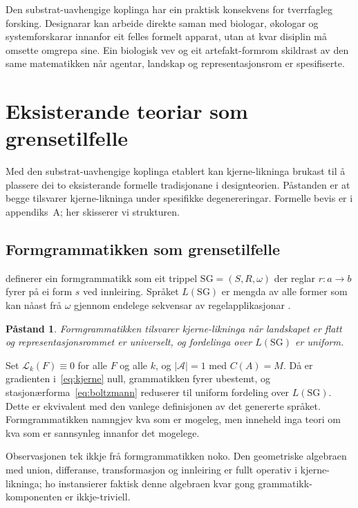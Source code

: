 \documentclass[10pt,a4paper,twocolumn]{article}
\newtheorem{proposition}{Påstand}
\begin{document}
Den substrat-uavhengige koplinga har ein praktisk konsekvens for tverrfagleg forsking. Designarar kan arbeide direkte saman med biologar, økologar og systemforskarar innanfor eit felles formelt apparat, utan at kvar disiplin må omsette omgrepa sine. Ein biologisk vev og eit artefakt-formrom skildrast av den same matematikken når agentar, landskap og representasjonsrom er spesifiserte.

\section{Eksisterande teoriar som grensetilfelle}

Med den substrat-uavhengige koplinga etablert kan kjerne-likninga brukast til å plassere dei to eksisterande formelle tradisjonane i designteorien. Påstanden er at begge tilsvarer kjerne-likninga under spesifikke degenereringar. Formelle bevis er i appendiks~A; her skisserer vi strukturen.

\subsection{Formgrammatikken som grensetilfelle}

\citet{stinygips1972} definerer ein formgrammatikk som eit trippel $\mathrm{SG} = (S, R, \omega)$ der reglar $r: a \to b$ fyrer på ei form $s$ ved innleiring. Språket $L(\mathrm{SG})$ er mengda av alle former som kan nåast frå $\omega$ gjennom endelege sekvensar av regelapplikasjonar \citep{stiny2006}.

\begin{proposition}
Formgrammatikken tilsvarer kjerne-likninga når landskapet er flatt og representasjonsrommet er universelt, og fordelinga over $L(\mathrm{SG})$ er uniform.
\end{proposition}

Set $\mathcal{L}_k(F) \equiv 0$ for alle $F$ og alle $k$, og $|\mathcal{A}| = 1$ med $C(A) = M$. Då er gradienten i~\ref{eq:kjerne} null, grammatikken fyrer ubestemt, og stasjonærforma~\ref{eq:boltzmann} reduserer til uniform fordeling over $L(\mathrm{SG})$. Dette er ekvivalent med den vanlege definisjonen av det genererte språket. Formgrammatikken namngjev kva som er mogeleg, men inneheld inga teori om kva som er sannsynleg innanfor det mogelege.

Observasjonen tek ikkje frå formgrammatikken noko. Den geometriske algebraen med union, differanse, transformasjon og innleiring \citep{stiny2006} er fullt operativ i kjerne-likninga; ho instansierer faktisk denne algebraen kvar gong grammatikk-komponenten er ikkje-triviell.
\end{document}
